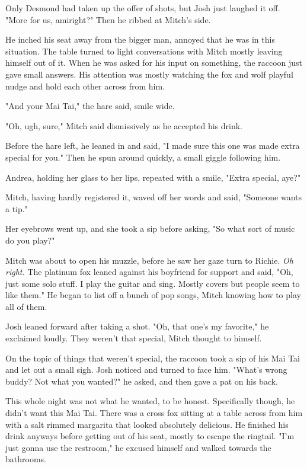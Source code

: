 Only Desmond had taken up the offer of shots, but Josh just laughed it off. "More for us, amiright?" Then he ribbed at Mitch's side.

He inched his seat away from the bigger man, annoyed that he was in this situation. The table turned to light conversations with Mitch mostly leaving himself out of it. When he was asked for his input on something, the raccoon just gave small answers. His attention was mostly watching the fox and wolf playful nudge and hold each other across from him.

"And your Mai Tai," the hare said, smile wide.

"Oh, ugh, sure," Mitch said dismissively as he accepted his drink.

Before the hare left, he leaned in and said, "I made sure this one was made extra special for you." Then he spun around quickly, a small giggle following him.

Andrea, holding her glass to her lips, repeated with a smile, "Extra special, aye?"

Mitch, having hardly registered it, waved off her words and said, "Someone wants a tip."

Her eyebrows went up, and she took a sip before asking, "So what sort of music do you play?"

Mitch was about to open his muzzle, before he saw her gaze turn to Richie. \emph{Oh right.} The platinum fox leaned against his boyfriend for support and said, "Oh, just some solo stuff. I play the guitar and sing. Mostly covers but people seem to like them." He began to list off a bunch of pop songs, Mitch knowing how to play all of them.

Josh leaned forward after taking a shot. "Oh, that one's my favorite," he exclaimed loudly. They weren't that special, Mitch thought to himself.

On the topic of things that weren't special, the raccoon took a sip of his Mai Tai and let out a small sigh. Josh noticed and turned to face him. "What's wrong buddy? Not what you wanted?" he asked, and then gave a pat on his back.

This whole night was not what he wanted, to be honest. Specifically though, he didn't want this Mai Tai. There was a cross fox sitting at a table across from him with a salt rimmed margarita that looked absolutely delicious. He finished his drink anyways before getting out of his seat, mostly to escape the ringtail. "I'm just gonna use the restroom," he excused himself and walked towards the bathrooms.

